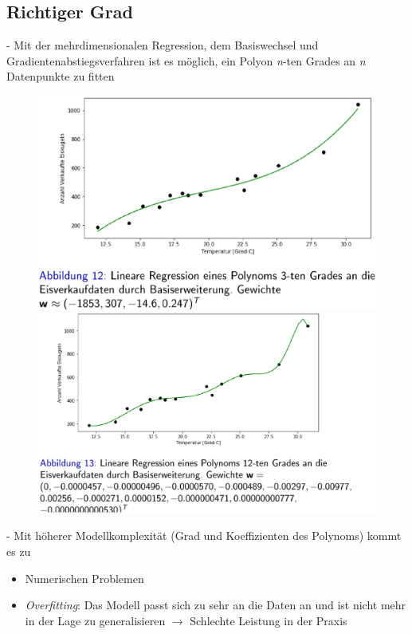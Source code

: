 \documentclass{report}
\begin{document}
\subsection{Richtiger Grad}
- Mit der mehrdimensionalen Regression, dem Basiswechsel und Gradientenabstiegsverfahren ist es möglich, ein Polyon \textit{n}-ten Grades an \textit{n} Datenpunkte zu fitten
\begin{figure}[H]
  \centering
  \begin{minipage}[b]{0.4\textwidth}
    \includegraphics[scale=.2125]{ml02_7}
  \end{minipage}
  \hfill
  \begin{minipage}[b]{0.4\textwidth}
    \includegraphics[scale=.2125]{ml02_8}
  \end{minipage}
\end{figure}

- Mit höherer Modellkomplexität (Grad und Koeffizienten des Polynoms) kommt es zu\\
\vspace*{-1.25em}
\begin{itemize}
  \item Numerischen Problemen
  \item \textit{Overfitting}: Das Modell passt sich zu sehr an die Daten an und ist nicht mehr in der Lage zu generalisieren
  $\rightarrow$ Schlechte Leistung in der Praxis
\end{itemize}
\end{document}
